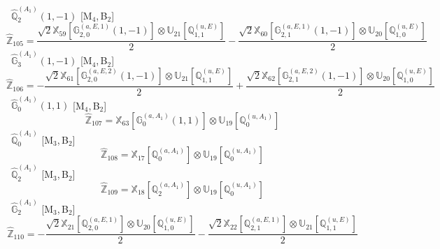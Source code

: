 \documentclass[fleqn,10pt,landscape]{article}
\begin{document}
\begin{itemize}
\noindent {} $\,\,\,\hat{\mathbb{Q}}_{2}^{(A_{1})}(1,-1)$ [M$_{4}$,\,B$_{2}$]
\begin{dmath*}
\hat{\mathbb{Z}}_{105}=\frac{\sqrt{2} \mathbb{X}_{59}[\mathbb{G}_{2,0}^{(a,E,1)}(1,-1)] \otimes\mathbb{U}_{21}[\mathbb{Q}_{1,1}^{(u,E)}]}{2} - \frac{\sqrt{2} \mathbb{X}_{60}[\mathbb{G}_{2,1}^{(a,E,1)}(1,-1)] \otimes\mathbb{U}_{20}[\mathbb{Q}_{1,0}^{(u,E)}]}{2}
\end{dmath*}
\vspace{4mm}
\noindent {} $\,\,\,\hat{\mathbb{G}}_{3}^{(A_{1})}(1,-1)$ [M$_{4}$,\,B$_{2}$]
\begin{dmath*}
\hat{\mathbb{Z}}_{106}=- \frac{\sqrt{2} \mathbb{X}_{61}[\mathbb{G}_{2,0}^{(a,E,2)}(1,-1)] \otimes\mathbb{U}_{21}[\mathbb{Q}_{1,1}^{(u,E)}]}{2} + \frac{\sqrt{2} \mathbb{X}_{62}[\mathbb{G}_{2,1}^{(a,E,2)}(1,-1)] \otimes\mathbb{U}_{20}[\mathbb{Q}_{1,0}^{(u,E)}]}{2}
\end{dmath*}
\vspace{4mm}
\noindent {} $\,\,\,\hat{\mathbb{G}}_{0}^{(A_{1})}(1,1)$ [M$_{4}$,\,B$_{2}$]
\begin{dmath*}
\hat{\mathbb{Z}}_{107}=\mathbb{X}_{63}[\mathbb{G}_{0}^{(a,A_{1})}(1,1)] \otimes\mathbb{U}_{19}[\mathbb{Q}_{0}^{(u,A_{1})}]
\end{dmath*}
\vspace{4mm}
\noindent {} $\,\,\,\hat{\mathbb{Q}}_{0}^{(A_{1})}$ [M$_{3}$,\,B$_{2}$]
\begin{dmath*}
\hat{\mathbb{Z}}_{108}=\mathbb{X}_{17}[\mathbb{Q}_{0}^{(a,A_{1})}] \otimes\mathbb{U}_{19}[\mathbb{Q}_{0}^{(u,A_{1})}]
\end{dmath*}
\vspace{4mm}
\noindent {} $\,\,\,\hat{\mathbb{Q}}_{2}^{(A_{1})}$ [M$_{3}$,\,B$_{2}$]
\begin{dmath*}
\hat{\mathbb{Z}}_{109}=\mathbb{X}_{18}[\mathbb{Q}_{2}^{(a,A_{1})}] \otimes\mathbb{U}_{19}[\mathbb{Q}_{0}^{(u,A_{1})}]
\end{dmath*}
\vspace{4mm}
\noindent {} $\,\,\,\hat{\mathbb{G}}_{2}^{(A_{1})}$ [M$_{3}$,\,B$_{2}$]
\begin{dmath*}
\hat{\mathbb{Z}}_{110}=- \frac{\sqrt{2} \mathbb{X}_{21}[\mathbb{Q}_{2,0}^{(a,E,1)}] \otimes\mathbb{U}_{20}[\mathbb{Q}_{1,0}^{(u,E)}]}{2} - \frac{\sqrt{2} \mathbb{X}_{22}[\mathbb{Q}_{2,1}^{(a,E,1)}] \otimes\mathbb{U}_{21}[\mathbb{Q}_{1,1}^{(u,E)}]}{2}
\end{dmath*}
\vspace{4mm}

\end{itemize}
\end{document}
